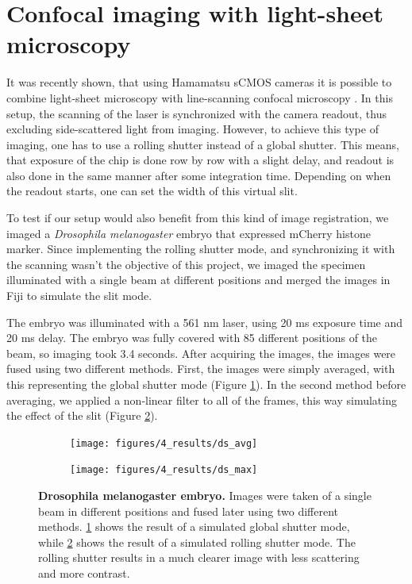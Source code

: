 \documentclass{diploma_style}
\begin{document}
\section{Confocal imaging with light-sheet microscopy}
It was recently shown, that using Hamamatsu sCMOS cameras it is possible to combine light-sheet microscopy with line-scanning confocal microscopy \cite{baumgart_scanned_2012}. In this setup, the scanning of the laser is synchronized with the camera readout, thus excluding side-scattered light from imaging. However, to achieve this type of imaging, one has to use a rolling shutter instead of a global shutter. This means, that exposure of the chip is done row by row with a slight delay, and readout is also done in the same manner after some integration time. Depending on when the readout starts, one can set the width of this virtual slit.

To test if our setup would also benefit from this kind of image registration, we imaged a \emph{Drosophila melanogaster} embryo that expressed mCherry histone marker. Since implementing the rolling shutter mode, and synchronizing it with the scanning wasn't the objective of this project, we imaged the specimen illuminated with a single beam at different positions and merged the images in Fiji to simulate the slit mode.

The embryo was illuminated with a 561 nm laser, using 20 ms exposure time and 20 ms delay. The embryo was fully covered with 85 different positions of the beam, so imaging took 3.4 seconds. After acquiring the images, the images were fused using two different methods. First, the images were simply averaged, with this representing the global shutter mode (Figure \ref{fig:ds_avg}). In the second method before averaging, we applied a non-linear filter to all of the frames, this way simulating the effect of the slit (Figure \ref{fig:ds_max}).

\begin{figure}[tbp]
	\centering
	\begin{subfigure}[b]{0.49\textwidth}
		\centering
		\texttt{[image: figures/4\_results/ds\_avg]}
		\caption{}
		\label{fig:ds_avg}
	\end{subfigure}
	\begin{subfigure}[b]{0.49\textwidth}
		\centering
		\texttt{[image: figures/4\_results/ds\_max]}
		\caption{}
		\label{fig:ds_max}
	\end{subfigure}
	\caption{\textbf{Drosophila melanogaster embryo.} Images were taken of a single beam in different positions and fused later using two different methods. \ref{fig:ds_avg} shows the result of a simulated global shutter mode, while \ref{fig:ds_max} shows the result of a simulated rolling shutter mode. The rolling shutter results in a much clearer image with less scattering and more contrast.}
	\label{fig:ds}
\end{figure}
\end{document}
